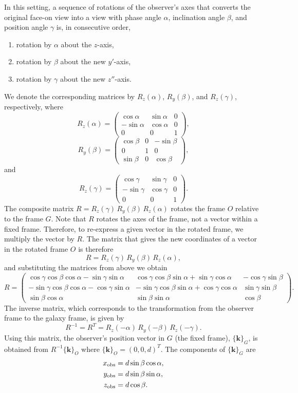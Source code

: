 \documentclass[english,a4paper]{kiseon_memo}
\begin{document}
In this setting, a sequence of rotations of the observer's axes
that converts the original face-on view into a view with phase
angle $\alpha$, inclination angle $\beta$, and position angle
$\gamma$ is, in consecutive order,
\begin{enumerate}
\item rotation by $\alpha$ about the $z$-axis,
\item rotation by $\beta$ about the new $y'$-axis,
\item rotation by $\gamma$ about the new $z''$-axis.
\end{enumerate}
We denote the corresponding matrices by $R_{z}(\alpha)$,
$R_{y}(\beta)$, and $R_{z}(\gamma)$, respectively, where
\[
R_{z}(\alpha)=\left(\begin{array}{ccc}
\cos\alpha & \sin\alpha & 0\\
-\sin\alpha & \cos\alpha & 0\\
0 & 0 & 1
\end{array}\right),
\]
\[
R_{y}(\beta)=\left(\begin{array}{ccc}
\cos\beta & 0 & -\sin\beta\\
0 & 1 & 0\\
\sin\beta & 0 & \cos\beta
\end{array}\right),
\]
and
\[
R_{z}(\gamma)=\left(\begin{array}{ccc}
\cos\gamma & \sin\gamma & 0\\
-\sin\gamma & \cos\gamma & 0\\
0 & 0 & 1
\end{array}\right).
\]
The composite matrix
$R = R_{z}(\gamma)\,R_{y}(\beta)\,R_{z}(\alpha)$ rotates the frame
$O$ relative to the frame $G$. Note that $R$ rotates the axes of
the frame, not a vector within a fixed frame. Therefore, to
re-express a given vector in the rotated frame, we multiply the
vector by $R$. The matrix that gives the new coordinates of a
vector in the rotated frame $O$ is therefore
\[
R = R_{z}(\gamma)\,R_{y}(\beta)\,R_{z}(\alpha),
\]
and substituting the matrices from above we obtain
\[
R=\left(\begin{array}{ccc}
\cos\gamma\cos\beta\cos\alpha-\sin\gamma\sin\alpha & \cos\gamma\cos\beta\sin\alpha+\sin\gamma\cos\alpha & -\cos\gamma\sin\beta\\
-\sin\gamma\cos\beta\cos\alpha-\cos\gamma\sin\alpha & -\sin\gamma\cos\beta\sin\alpha+\cos\gamma\cos\alpha & \sin\gamma\sin\beta\\
\sin\beta\cos\alpha & \sin\beta\sin\alpha & \cos\beta
\end{array}\right).
\]
The inverse matrix, which corresponds to the transformation from
the observer frame to the galaxy frame, is given by
\[
R^{-1}=R^{T}=R_{z}(-\alpha)\,R_{y}(-\beta)\,R_{z}(-\gamma).
\]
Using this matrix, the observer's position vector in $G$ (the fixed
frame), $\{\mathbf{k}\}_{G}$, is obtained from
$R^{-1}\{\mathbf{k}\}_{O}$ where $\{\mathbf{k}\}_{O}=(0,0,d)^{T}$.
The components of $\{\mathbf{k}\}_{G}$ are
\begin{align*}
x_{\rm obs} & = d\sin\beta\cos\alpha,\\
y_{\rm obs} & = d\sin\beta\sin\alpha,\\
z_{\rm obs} & = d\cos\beta.
\end{align*}
\end{document}
